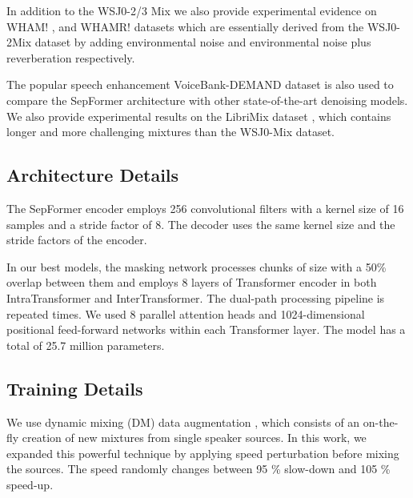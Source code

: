 \documentclass[lettersize,journal]{IEEEtran}
\begin{document}
In addition to the WSJ0-2/3 Mix we also provide experimental evidence on WHAM! \cite{wichern2019wham}, and WHAMR! datasets \cite{maciejewski2020whamr} which are essentially derived from the WSJ0-2Mix dataset by adding environmental noise and environmental noise plus reverberation respectively. 

The popular speech enhancement VoiceBank-DEMAND dataset \cite{ValentiniBotinhao2016InvestigatingRS} is also used to compare the SepFormer architecture with other state-of-the-art denoising models.
We also provide experimental results on the LibriMix dataset \cite{cosentino2020librimix}, which contains longer and more challenging mixtures than the WSJ0-Mix dataset. 



\subsection{Architecture Details}

The SepFormer encoder employs 256 convolutional filters with a kernel size of 16 samples and a stride factor of 8. The decoder uses the same kernel size and the stride factors of the encoder. 

In our best models, the masking network processes chunks of size  with a 50\% overlap between them and employs 8 layers of Transformer encoder in both IntraTransformer and InterTransformer. The dual-path processing pipeline is repeated  times. We used 8 parallel attention heads and 1024-dimensional positional feed-forward networks within each Transformer layer. The model has a total of 25.7 million parameters. 

\subsection{Training Details}
\newcommand{\dataaug}{DM}
We use dynamic mixing (DM) data augmentation \cite{zeghidour2020wavesplit}, which consists of an on-the-fly creation of new mixtures from single speaker sources. In this work, we expanded this powerful technique by applying speed perturbation before mixing the sources. The speed randomly changes between 95 \% slow-down and 105 \% speed-up.
\end{document}
